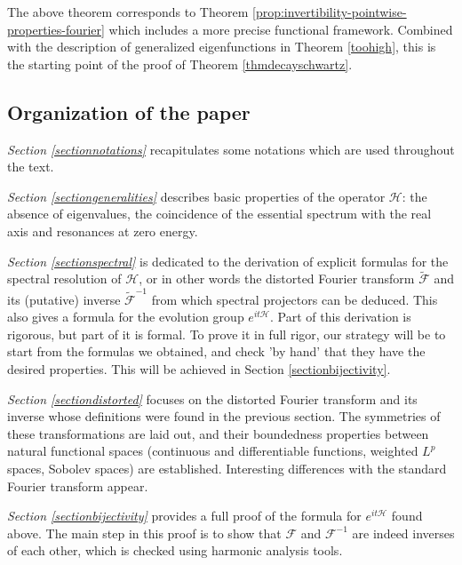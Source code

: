 \documentclass[11 pt]{amsart}
\theoremstyle{definition}
\theoremstyle{remark}
\numberwithin{equation}{section}
\begin{document}
The above theorem corresponds to Theorem \ref{prop:invertibility-pointwise-properties-fourier} which includes a more precise functional framework. Combined with the description of generalized eigenfunctions in Theorem \ref{toohigh}, this is the starting point of the proof of Theorem \ref{thmdecayschwartz}.

\subsection{Organization of the paper} 

\textit{Section \ref{sectionnotations}} recapitulates some notations which are used throughout the text.

\smallskip

\textit{Section \ref{sectiongeneralities}} describes basic properties of the operator $\mathcal{H}$: the absence of eigenvalues, the coincidence of the essential spectrum with the real axis and resonances at zero energy.

\smallskip

\textit{Section \ref{sectionspectral}} is dedicated to the derivation of explicit formulas for the spectral resolution of $\mathcal{H}$, or in other words the distorted Fourier transform $\widetilde{\mathcal{F}}$ and its (putative) inverse $\widetilde{\mathcal{F}}^{-1}$ from which spectral projectors can be deduced. This also gives a formula for the evolution group $e^{it\mathcal{H}}$. Part of this derivation is rigorous, but part of it is formal. To prove it in full rigor, our strategy will be to start from the formulas we obtained, and check 'by hand' that they have the desired properties. This will be achieved in Section \ref{sectionbijectivity}.

\smallskip

\textit{Section \ref{sectiondistorted}} focuses on the distorted Fourier transform and its inverse whose definitions were found in the previous section. The symmetries of these transformations are laid out, and their boundedness properties between natural functional spaces (continuous and differentiable functions, weighted $L^p$ spaces, Sobolev spaces) are established. Interesting differences with the standard Fourier transform appear.

\smallskip 

\textit{Section \ref{sectionbijectivity}} provides a full proof of the formula for $e^{it \mathcal{H}}$ found above. The main step in this proof is to show that $\mathcal{F}$ and $\mathcal{F}^{-1}$ are indeed inverses of each other, which is checked using harmonic analysis tools.
\end{document}
